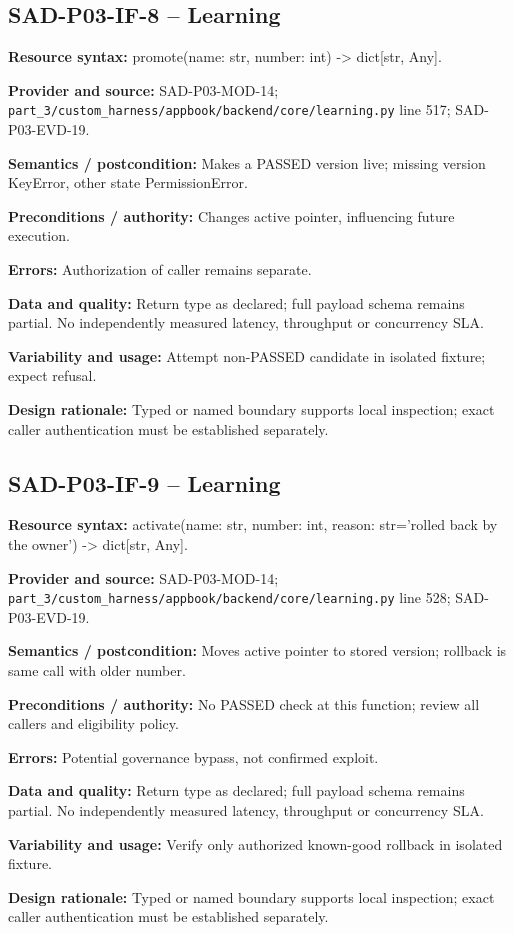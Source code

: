 \documentclass[10pt,letterpaper]{article}
\begin{document}
\subsection{SAD-P03-IF-8 -- Learning}
{\raggedright \textbf{Resource syntax:} promote(\allowbreak{}name: str, number: int) -> dict[str, Any].\par}
\textbf{Provider and source:} SAD-P03-MOD-14; \nolinkurl{part_3/custom_harness/appbook/backend/core/learning.py} line 517; SAD-P03-EVD-19.\par
\textbf{Semantics / postcondition:} Makes a PASSED version live; missing version KeyError, other state PermissionError.\par
\textbf{Preconditions / authority:} Changes active pointer, influencing future execution.\par
\textbf{Errors:} Authorization of caller remains separate.\par
\textbf{Data and quality:} Return type as declared; full payload schema remains partial. No independently measured latency, throughput or concurrency SLA.\par
\textbf{Variability and usage:} Attempt non-PASSED candidate in isolated fixture; expect refusal.\par
\textbf{Design rationale:} Typed or named boundary supports local inspection; exact caller authentication must be established separately.\par

\subsection{SAD-P03-IF-9 -- Learning}
{\raggedright \textbf{Resource syntax:} activate(\allowbreak{}name: str, number: int, reason: str='rolled back by the owner') -> dict[str, Any].\par}
\textbf{Provider and source:} SAD-P03-MOD-14; \nolinkurl{part_3/custom_harness/appbook/backend/core/learning.py} line 528; SAD-P03-EVD-19.\par
\textbf{Semantics / postcondition:} Moves active pointer to stored version; rollback is same call with older number.\par
\textbf{Preconditions / authority:} No PASSED check at this function; review all callers and eligibility policy.\par
\textbf{Errors:} Potential governance bypass, not confirmed exploit.\par
\textbf{Data and quality:} Return type as declared; full payload schema remains partial. No independently measured latency, throughput or concurrency SLA.\par
\textbf{Variability and usage:} Verify only authorized known-good rollback in isolated fixture.\par
\textbf{Design rationale:} Typed or named boundary supports local inspection; exact caller authentication must be established separately.\par
\end{document}
